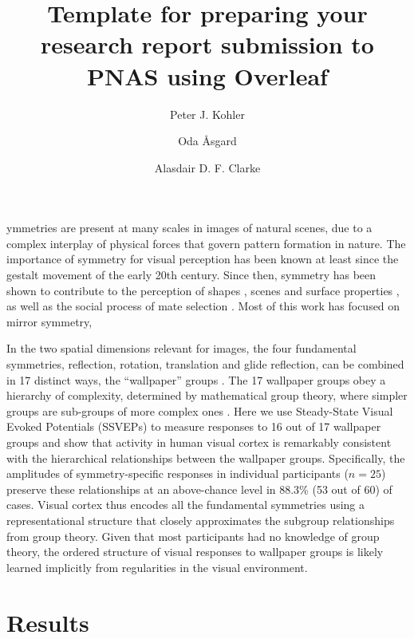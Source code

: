 \documentclass[9pt,twocolumn,twoside,lineno]{pnas-new}
\title{Template for preparing your research report submission to PNAS using Overleaf}
\author[a,1]{Peter J. Kohler}
\author[b]{Oda \r{A}sgard}
\author[b]{Alasdair D. F. Clarke}
\affil[a]{Stanford University, Department of Psychology}
\affil[b]{University of Essex, Department of Psychology, Colchester, UK, CO4 3SQ}
\begin{document}
\maketitle
\thispagestyle{firststyle}

ymmetries are present at many scales in images of natural scenes, due to a complex interplay of physical forces that govern pattern formation in nature. The importance of symmetry for visual perception has been known at least since the gestalt movement of the early 20th century. Since then, symmetry has been shown to contribute to the perception of shapes \cite{RN1311,RN1682}, scenes \cite{RN1824} and surface properties \cite{RN1166}, as well as the social process of mate selection \cite{RN1337}. Most of this work has focused on mirror symmetry, 


In the two spatial dimensions relevant for images, the four fundamental symmetries, reflection, rotation, translation and glide reflection, can be combined in 17 distinct ways, the “wallpaper” groups \cite{RN1562,RN1563,RN1425}. The 17 wallpaper groups obey a hierarchy of complexity, determined by mathematical group theory, where simpler groups are sub-groups of more complex ones \cite{RN1711}. Here we use Steady-State Visual Evoked Potentials (SSVEPs) to measure responses to 16 out of 17 wallpaper groups and show that activity in human visual cortex is remarkably consistent with the hierarchical relationships between the wallpaper groups. Specifically, the amplitudes of symmetry-specific responses in individual participants ($n=25$) preserve these relationships at an above-chance level in 88.3\% (53 out of 60) of cases. Visual cortex thus encodes all the fundamental symmetries using a representational structure that closely approximates the subgroup relationships from group theory. Given that most participants had no knowledge of group theory, the ordered structure of visual responses to wallpaper groups is likely learned implicitly from regularities in the visual environment.


\section*{Results}
\end{document}
